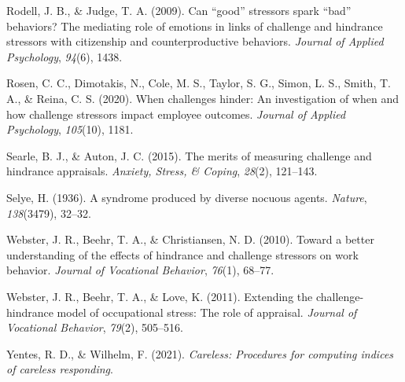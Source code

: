 \documentclass[
  man]{apa6}
\newlength{\cslhangindent}
\newlength{\cslentryspacingunit} %
\newenvironment{CSLReferences}[2] %
 {%
  \setlength{\parindent}{0pt}
  \ifodd #1
  \let\oldpar\par
  \def\par{\hangindent=\cslhangindent\oldpar}
  \fi
  \setlength{\parskip}{#2\cslentryspacingunit}
 }%
 {}
\begin{document}
\begin{CSLReferences}{1}{0}
\leavevmode{}%
Rodell, J. B., \& Judge, T. A. (2009). Can {``good''} stressors spark {``bad''} behaviors? The mediating role of emotions in links of challenge and hindrance stressors with citizenship and counterproductive behaviors. \emph{Journal of Applied Psychology}, \emph{94}(6), 1438.

\leavevmode{}%
Rosen, C. C., Dimotakis, N., Cole, M. S., Taylor, S. G., Simon, L. S., Smith, T. A., \& Reina, C. S. (2020). When challenges hinder: An investigation of when and how challenge stressors impact employee outcomes. \emph{Journal of Applied Psychology}, \emph{105}(10), 1181.

\leavevmode{}%
Searle, B. J., \& Auton, J. C. (2015). The merits of measuring challenge and hindrance appraisals. \emph{Anxiety, Stress, \& Coping}, \emph{28}(2), 121--143.

\leavevmode{}%
Selye, H. (1936). A syndrome produced by diverse nocuous agents. \emph{Nature}, \emph{138}(3479), 32--32.

\leavevmode{}%
Webster, J. R., Beehr, T. A., \& Christiansen, N. D. (2010). Toward a better understanding of the effects of hindrance and challenge stressors on work behavior. \emph{Journal of Vocational Behavior}, \emph{76}(1), 68--77.

\leavevmode{}%
Webster, J. R., Beehr, T. A., \& Love, K. (2011). Extending the challenge-hindrance model of occupational stress: The role of appraisal. \emph{Journal of Vocational Behavior}, \emph{79}(2), 505--516.

\leavevmode{}%
Yentes, R. D., \& Wilhelm, F. (2021). \emph{Careless: Procedures for computing indices of careless responding}.

\end{CSLReferences}

\endgroup
\end{document}
